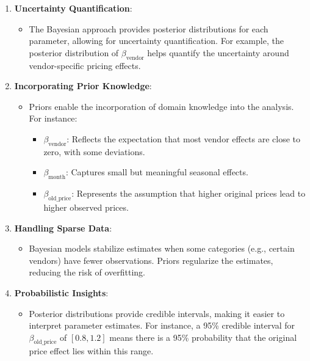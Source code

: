 \documentclass[
  letterpaper,
  DIV=11,
  numbers=noendperiod]{scrartcl}
\providecommand{\tightlist}{%
  \setlength{\itemsep}{0pt}\setlength{\parskip}{0pt}}\usepackage{longtable,booktabs,array}
\begin{document}
\begin{enumerate}
\def\labelenumi{\arabic{enumi}.}
\item
  \textbf{Uncertainty Quantification}:

  \begin{itemize}
  \tightlist
  \item
    The Bayesian approach provides posterior distributions for each
    parameter, allowing for uncertainty quantification. For example, the
    posterior distribution of \(\beta_{\text{vendor}}\) helps quantify
    the uncertainty around vendor-specific pricing effects.
  \end{itemize}
\item
  \textbf{Incorporating Prior Knowledge}:

  \begin{itemize}
  \tightlist
  \item
    Priors enable the incorporation of domain knowledge into the
    analysis. For instance:

    \begin{itemize}
    \tightlist
    \item
      \(\beta_{\text{vendor}}\): Reflects the expectation that most
      vendor effects are close to zero, with some deviations.
    \item
      \(\beta_{\text{month}}\): Captures small but meaningful seasonal
      effects.
    \item
      \(\beta_{\text{old\_price}}\): Represents the assumption that
      higher original prices lead to higher observed prices.
    \end{itemize}
  \end{itemize}
\item
  \textbf{Handling Sparse Data}:

  \begin{itemize}
  \tightlist
  \item
    Bayesian models stabilize estimates when some categories (e.g.,
    certain vendors) have fewer observations. Priors regularize the
    estimates, reducing the risk of overfitting.
  \end{itemize}
\item
  \textbf{Probabilistic Insights}:

  \begin{itemize}
  \tightlist
  \item
    Posterior distributions provide credible intervals, making it easier
    to interpret parameter estimates. For instance, a 95\% credible
    interval for \(\beta_{\text{old\_price}}\) of \([0.8, 1.2]\) means
    there is a 95\% probability that the original price effect lies
    within this range.
  \end{itemize}
\end{enumerate}
\end{document}
